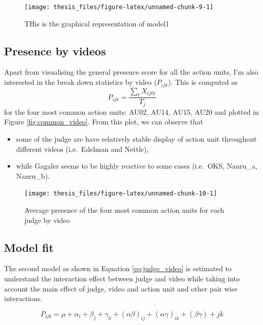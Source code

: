 \documentclass{monashthesis}
\begin{document}
\begin{figure}
\texttt{[image: thesis\_files/figure-latex/unnamed-chunk-9-1]} \caption{THis is the graphical representation of model1\label{fig:model_1_plot}}\label{fig:unnamed-chunk-9}
\end{figure}

\hypertarget{presence-by-videos}{%
\subsection{Presence by videos}\label{presence-by-videos}}

Apart from visualising the general presence score for all the action units, I'm also interested in the break down statistics by video (\(P_{ijk}\)). This is computed as \[P_{ijk} = \frac{\sum_{t}X_{ijtk}}{T_j}\] for the four most common action units: AU02, AU14, AU15, AU20 and plotted in Figure \ref{fig:common_video}. From this plot, we can observe that

\begin{itemize}
\item
  some of the judge are have relatively stable display of action unit throughout different videos (i.e.~Edelman and Nettle),
\item
  while Gagaler seems to be highly reactive to some cases (i.e.~OKS, Nauru\_a, Nauru\_b).
\end{itemize}

\begin{figure}
\texttt{[image: thesis\_files/figure-latex/unnamed-chunk-10-1]} \caption{Average presence of the four most common action units for each judge by video\label{fig:common_video}}\label{fig:unnamed-chunk-10}
\end{figure}

\hypertarget{model-fit-1}{%
\subsection{Model fit}\label{model-fit-1}}

The second model as shown in Equation \ref{eq:judge_video} is estimated to understand the interaction effect between judge and video while taking into account the main effect of judge, video and action unit and other pair wise interactions.

\begin{equation}\label{eq:judge_video}
P_{ijk} = \mu + \alpha_i + \beta_j +\gamma_k + (\alpha\beta)_{ij} + (\alpha\gamma)_{ik} + (\beta\gamma)+{jk}
\end{equation}
\end{document}
